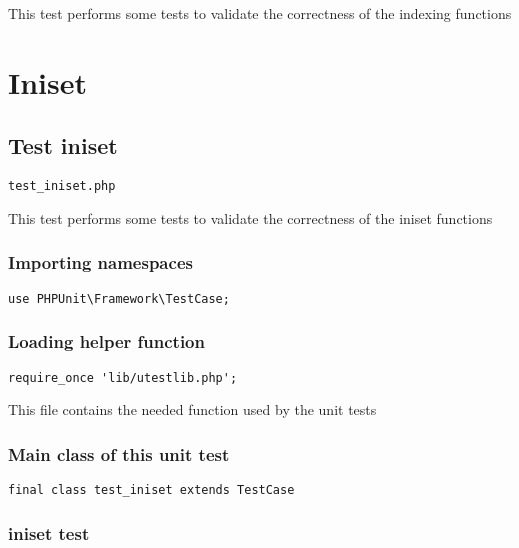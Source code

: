 \documentclass[a4paper]{article}
\begin{document}
This test performs some tests to validate the correctness
of the indexing functions


\hypertarget{toc273}{}
\section{Iniset}

\hypertarget{toc274}{}
\subsection{Test iniset}

\begin{lstlisting}
test_iniset.php
\end{lstlisting}

This test performs some tests to validate the correctness
of the iniset functions

\hypertarget{toc275}{}
\subsubsection{Importing namespaces}

\begin{lstlisting}
use PHPUnit\Framework\TestCase;
\end{lstlisting}

\hypertarget{toc276}{}
\subsubsection{Loading helper function}

\begin{lstlisting}
require_once 'lib/utestlib.php';
\end{lstlisting}

This file contains the needed function used by the unit tests

\hypertarget{toc277}{}
\subsubsection{Main class of this unit test}

\begin{lstlisting}
final class test_iniset extends TestCase
\end{lstlisting}

\hypertarget{toc278}{}
\subsubsection{iniset test}
\end{document}
